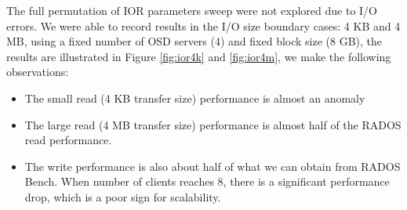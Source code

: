 The full permutation of IOR parameters sweep were not explored due to I/O
errors.  We were able to record results in the I/O size boundary cases:
4 KB and 4 MB, using a fixed number of
OSD servers (4) and fixed block size (8 GB), the results are illustrated in
Figure \ref{fig:ior4k} and \ref{fig:ior4m}, we make the following
observations:


\begin{itemize}

  \item The small read (4 KB transfer size) performance is almost an anomaly

  \item The large read (4 MB transfer size) performance is almost half of the
  RADOS read performance.
   
  \item The write performance is also about half of what we can obtain from
  RADOS Bench. When number of clients reaches 8, there is a significant
  performance drop, which is a poor sign for scalability. 

\end{itemize}

